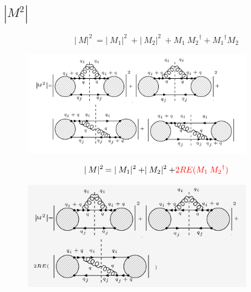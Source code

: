 \pagebreak

\subsection{$|M^{2}|$}
\begin{equation}
\lvert\:M\lvert^2\: = \lvert\:M_1\lvert^2\:+\lvert\:M_2\lvert^2\:+ M_1\: {M_2}^{\dagger} +{M_1}^{\dagger} M_2
\end{equation}
\begin{figure}[h!]
\centering
\includegraphics[width=0.85\textwidth]{images/qqgMSquer.png}
\end{figure}
\begin{equation}
\lvert\:M\lvert^2\: = \lvert\:M_1\lvert^2\:+\lvert\:M_2\lvert^2\:+ {\color[RGB]{255,0,0} 2RE(M_1\: {M_2}^{\dagger})}
\end{equation}
\begin{figure}[h!]
\centering
\includegraphics[width=0.85\textwidth]{images/REqqgMSquer.png}
\end{figure}

\newpage